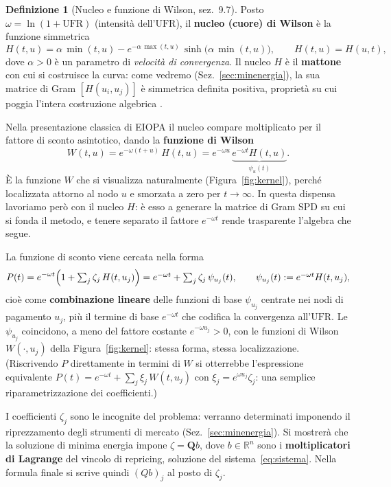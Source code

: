 \documentclass[11pt,a4paper]{article}
\theoremstyle{plain}
\theoremstyle{definition}
\newtheorem{definizione}[teorema]{Definizione}
\theoremstyle{remark}
\newcommand{\UFR}{\ensuremath{\mathrm{UFR}}}
\newcommand{\Qmat}{\mathbf{Q}}
\begin{document}
\begin{definizione}[Nucleo e funzione di Wilson, \cite{eiopa2025} sez.~9.7]
Posto $\omega = \ln(1+\UFR)$ (intensit\`a dell'$\UFR$), il \textbf{nucleo (cuore) di Wilson}
\`e la funzione simmetrica
\[
  H(t,u) = \alpha\,\min(t,u) - e^{-\alpha\,\max(t,u)}\,\sinh\!\bigl(\alpha\,\min(t,u)\bigr),
  \qquad H(t,u) = H(u,t),
\]
dove $\alpha>0$ \`e un parametro di \emph{velocit\`a di convergenza}. Il nucleo $H$ \`e il
\textbf{mattone} con cui si costruisce la curva: come vedremo (Sez.~\ref{sec:minenergia}), la
sua matrice di Gram $[H(u_i,u_j)]$ \`e simmetrica definita positiva, propriet\`a su cui poggia
l'intera costruzione algebrica \cite{fasshauer2007,lageras2016}.
\end{definizione}

Nella presentazione classica di EIOPA il nucleo compare moltiplicato per il fattore di sconto
asintotico, dando la \textbf{funzione di Wilson}
\[
  W(t,u) = e^{-\omega(t+u)}\,H(t,u)
         = e^{-\omega u}\,\underbrace{e^{-\omega t}H(t,u)}_{\displaystyle \psi_u(t)} .
\]
\`E la funzione $W$ che si visualizza naturalmente (Figura~\ref{fig:kernel}), perch\'e
localizzata attorno al nodo $u$ e smorzata a zero per $t\to\infty$. In questa dispensa
lavoriamo per\`o con il nucleo $H$: \`e esso a generare la matrice di Gram SPD su cui si fonda
il metodo, e tenere separato il fattore $e^{-\omega t}$ rende trasparente l'algebra che segue.

La funzione di sconto viene cercata nella forma
\begin{equation}
  P(t) = e^{-\omega t}\Bigl(1 + \textstyle\sum_{j} \zeta_j\, H(t,u_j)\Bigr)
       = e^{-\omega t} + \textstyle\sum_{j} \zeta_j\,\psi_{u_j}(t),
  \qquad \psi_{u_j}(t) := e^{-\omega t}H(t,u_j),
  \label{eq:sw-P}
\end{equation}
cio\`e come \textbf{combinazione lineare} delle funzioni di base $\psi_{u_j}$ centrate nei nodi
di pagamento $u_j$, pi\`u il termine di base $e^{-\omega t}$ che codifica la convergenza
all'$\UFR$. Le $\psi_{u_j}$ coincidono, a meno del fattore costante $e^{-\omega u_j}>0$, con le
funzioni di Wilson $W(\cdot,u_j)$ della Figura~\ref{fig:kernel}: stessa forma, stessa
localizzazione. (Riscrivendo $P$ direttamente in termini di $W$ si otterrebbe l'espressione
equivalente $P(t)=e^{-\omega t}+\sum_j \xi_j\,W(t,u_j)$ con $\xi_j = e^{\omega u_j}\zeta_j$:
una semplice riparametrizzazione dei coefficienti.)

I coefficienti $\zeta_j$ sono le incognite del problema: verranno determinati imponendo il
riprezzamento degli strumenti di mercato (Sez.~\ref{sec:minenergia}). Si mostrer\`a che la
soluzione di minima energia impone $\zeta = \Qmat b$, dove $b \in \mathbb{R}^n$ sono i
\textbf{moltiplicatori di Lagrange} del vincolo di repricing, soluzione del
sistema~\eqref{eq:sistema}. Nella formula finale si scrive quindi $(Qb)_j$ al posto di
$\zeta_j$.
\end{document}
